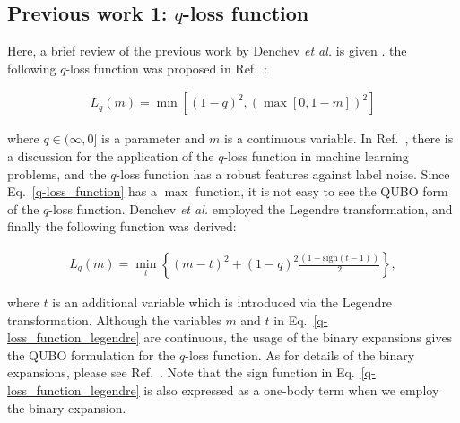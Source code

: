 \documentclass[fp,twocolumn]{jpsj3}
\begin{document}
\subsection{Previous work 1: $q$-loss function}

Here, a brief review of the previous work by Denchev \textit{et al.} is given \cite{q-loss}.
the following $q$-loss function was proposed in Ref.~:

\begin{eqnarray}
  L_{q}(m)=\min{[(1-q)^{2}, (\max{[0,1-m]})^{2}]} \label{q-loss_function}
\end{eqnarray}

\noindent
where $q \in (\infty,0]$ is a parameter and $m$ is a continuous variable. 
In Ref.~, there is a discussion for the application of the $q$-loss function in machine learning problems, and the $q$-loss function has a robust features against label noise.
Since Eq.~\ref{q-loss_function} has a $\max$ function, it is not easy to see the QUBO form of the $q$-loss function.
Denchev \textit{et al.} employed the Legendre transformation,
and finally the following function was derived\cite{q-loss}:

\begin{eqnarray}
  L_{q}(m)=\min_{t}{\left\{(m-t)^{2}+(1-q)^{2}\frac{(1-\text{sign}(t-1))}{2}\right\}}, \label{q-loss_function_legendre}
\end{eqnarray}

where $t$ is an additional variable which is introduced via the Legendre transformation.
Although the variables $m$ and $t$ in Eq.~\eqref{q-loss_function_legendre} are continuous, the usage of the binary expansions gives the QUBO formulation for the $q$-loss function.
As for details of the binary expansions, please see Ref.~.
Note that the sign function in Eq.~\eqref{q-loss_function_legendre} is also expressed as a one-body term when we employ the binary expansion.


\end{document}
